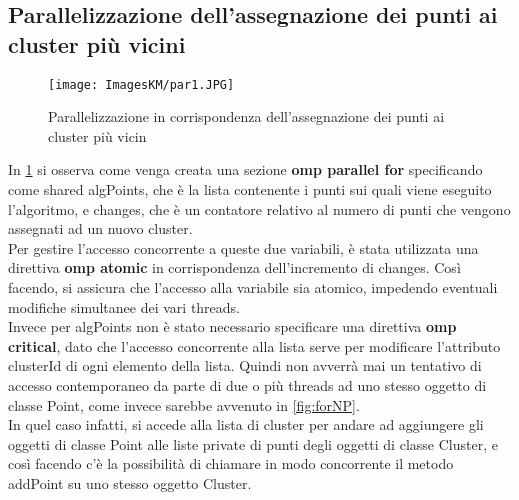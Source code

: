 \documentclass[10pt,twocolumn,letterpaper]{article}
\begin{document}
\subsection{Parallelizzazione dell'assegnazione dei punti ai cluster più vicini}
\begin{figure}[h]
    \centering
    \texttt{[image: ImagesKM/par1.JPG]}
    \caption{Parallelizzazione in corrispondenza dell'assegnazione dei punti ai cluster più vicin}
    \label{fig:p1}
\end{figure}
In \cref{fig:p1} si osserva come venga creata una sezione \textbf{omp parallel for} specificando come shared algPoints, che è la lista contenente i punti sui quali viene eseguito l'algoritmo, e changes, che è un contatore relativo al numero di punti che vengono assegnati ad un nuovo cluster.\\
Per gestire l'accesso concorrente a queste due variabili, è stata utilizzata una direttiva \textbf{omp atomic} in corrispondenza dell'incremento di changes. Così facendo, si assicura che l'accesso alla variabile sia atomico, impedendo eventuali modifiche simultanee dei vari threads.\\
Invece per algPoints non è stato necessario specificare una direttiva \textbf{omp critical}, dato che l'accesso concorrente alla lista serve per modificare l'attributo clusterId di ogni elemento della lista. Quindi non avverrà mai un tentativo di accesso contemporaneo da parte di due o più threads ad uno stesso oggetto di classe Point, come invece sarebbe avvenuto in \cref{fig:forNP}.\\
In quel caso infatti, si accede alla lista di cluster per andare ad aggiungere gli oggetti di classe Point alle liste private di punti degli oggetti di classe Cluster, e così facendo c'è la possibilità di chiamare in modo concorrente il metodo addPoint su uno stesso oggetto Cluster.
\end{document}
